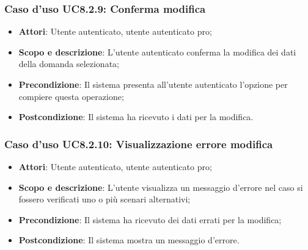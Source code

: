 








	\subsubsection{Caso d'uso UC8.2.9: Conferma modifica}
	\begin{itemize}
		\item
			\textbf{Attori}: Utente autenticato, utente autenticato pro;
		\item
			\textbf{Scopo e descrizione}: L'utente autenticato conferma la modifica dei dati della domanda selezionata;
		\item		
			\textbf{Precondizione}: Il sistema presenta all'utente autenticato l'opzione per compiere questa operazione;
		\item
			\textbf{Postcondizione}: Il sistema ha ricevuto i dati per la modifica.
	\end{itemize}		
	\subsubsection{Caso d'uso UC8.2.10: Visualizzazione errore modifica}
	\begin{itemize}
		\item
			\textbf{Attori}: Utente autenticato, utente autenticato pro;
		\item
			\textbf{Scopo e descrizione}: L'utente visualizza un messaggio d'errore nel caso si fossero verificati uno o più scenari alternativi;
		\item		
			\textbf{Precondizione}: Il sistema ha ricevuto dei dati errati per la modifica;
		\item
			\textbf{Postcondizione}: Il sistema mostra un messaggio d'errore.
	\end{itemize}	
	
